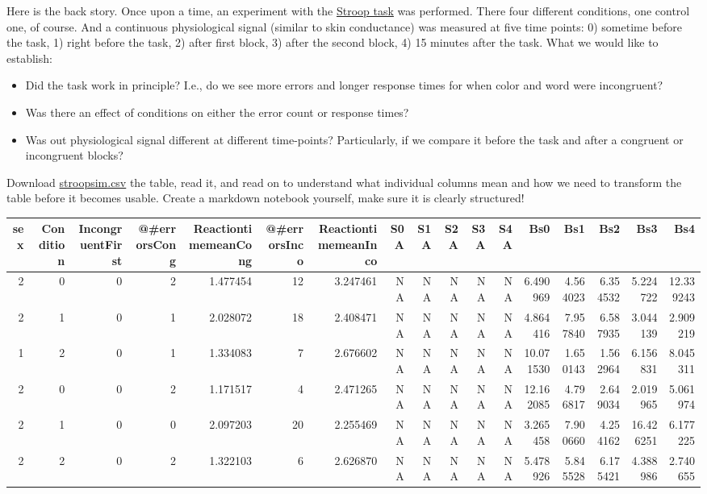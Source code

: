 \documentclass[
]{book}
\providecommand{\tightlist}{%
  \setlength{\itemsep}{0pt}\setlength{\parskip}{0pt}}
\begin{document}
Here is the back story. Once upon a time, an experiment with the \href{https://en.wikipedia.org/wiki/Stroop_effect}{Stroop task} was performed. There four different conditions, one control one, of course. And a continuous physiological signal (similar to skin conductance) was measured at five time points: 0) sometime before the task, 1) right before the task, 2) after first block, 3) after the second block, 4) 15 minutes after the task. What we would like to establish:

\begin{itemize}
\tightlist
\item
  Did the task work in principle? I.e., do we see more errors and longer response times for when color and word were incongruent?
\item
  Was there an effect of conditions on either the error count or response times?
\item
  Was out physiological signal different at different time-points? Particularly, if we compare it before the task and after a congruent or incongruent blocks?
\end{itemize}

Download \href{data/stroopsim.csv}{stroopsim.csv} the table, read it, and read on to understand what individual columns mean and how we need to transform the table before it becomes usable. Create a markdown notebook yourself, make sure it is clearly structured!

\begin{tabular}{r|r|r|r|r|r|r|r|r|r|r|r|r|r|r|r|r}
\hline
sex & Condition & IncongruentFirst & @\#errorsCong & ReactiontimemeanCong & @\#errorsInco & ReactiontimemeanInco & S0A & S1A & S2A & S3A & S4A & Bs0 & Bs1 & Bs2 & Bs3 & Bs4\\
\hline
2 & 0 & 0 & 2 & 1.477454 & 12 & 3.247461 & NA & NA & NA & NA & NA & 6.490969 & 4.564023 & 6.354532 & 5.224722 & 12.339243\\
\hline
2 & 1 & 0 & 1 & 2.028072 & 18 & 2.408471 & NA & NA & NA & NA & NA & 4.864416 & 7.957840 & 6.587935 & 3.044139 & 2.909219\\
\hline
1 & 2 & 0 & 1 & 1.334083 & 7 & 2.676602 & NA & NA & NA & NA & NA & 10.071530 & 1.650143 & 1.562964 & 6.156831 & 8.045311\\
\hline
2 & 0 & 0 & 2 & 1.171517 & 4 & 2.471265 & NA & NA & NA & NA & NA & 12.162085 & 4.796817 & 2.649034 & 2.019965 & 5.061974\\
\hline
2 & 1 & 0 & 0 & 2.097203 & 20 & 2.255469 & NA & NA & NA & NA & NA & 3.265458 & 7.900660 & 4.254162 & 16.426251 & 6.177225\\
\hline
2 & 2 & 0 & 2 & 1.322103 & 6 & 2.626870 & NA & NA & NA & NA & NA & 5.478926 & 5.845528 & 6.175421 & 4.388986 & 2.740655\\
\hline
\end{tabular}
\end{document}
